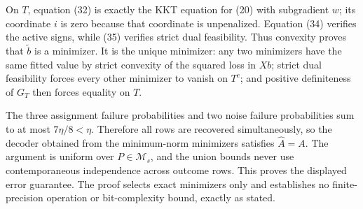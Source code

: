 On \(T\), equation (32) is exactly the KKT equation for (20) with subgradient \(w\); its coordinate \(i\) is zero because that coordinate is unpenalized.  Equation (34) verifies the active signs, while (35) verifies strict dual feasibility.  Thus convexity proves that \(\widetilde b\) is a minimizer.  It is the unique minimizer: any two minimizers have the same fitted value by strict convexity of the squared loss in \(Xb\); strict dual feasibility forces every other minimizer to vanish on \(T^c\); and positive definiteness of \(G_T\) then forces equality on \(T\).

The three assignment failure probabilities and two noise failure probabilities sum to at most \(7\eta/8<\eta\).  Therefore all rows are recovered simultaneously, so the decoder obtained from the minimum-norm minimizers satisfies \(\widehat A=A\).  The argument is uniform over \(P\in\mathcal M_s\), and the union bounds never use contemporaneous independence across outcome rows.  This proves the displayed error guarantee.  The proof selects exact minimizers only and establishes no finite-precision operation or bit-complexity bound, exactly as stated.